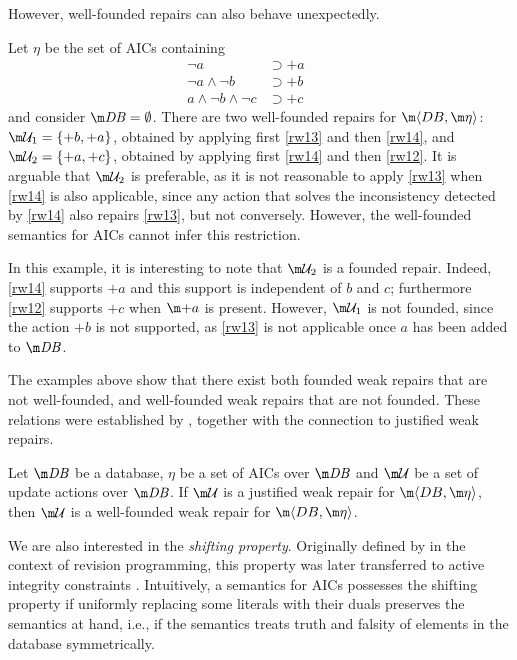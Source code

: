However, well-founded repairs can also behave unexpectedly.
\begin{example}
  \label{ex:well-founded}
  Let $\eta$ be the set of AICs containing
  \begin{align}
  \neg a &\supset{+a} \qquad \label{rw14} \\
  \neg a\land\neg b &\supset{+b} \label{rw13} \\
  a\land\neg b\land\neg c &\supset{+c} \label{rw12}
  \end{align}
  and consider $\db=\emptyset$.
  There are two well-founded repairs for $\fulldb$: $\UU_1=\{{+b},{+a}\}$, obtained by applying first \ref{rw13} and then \ref{rw14}, and $\UU_2=\{{+a},{+c}\}$, obtained by applying first \ref{rw14} and then \ref{rw12}.
  It is arguable that $\UU_2$ is preferable, as it is not reasonable to apply \ref{rw13} when \ref{rw14} is also applicable, since any action that solves the inconsistency detected by \ref{rw14} also repairs \ref{rw13}, but not conversely.
  However, the well-founded semantics for AICs cannot infer this restriction.
\end{example}
In this example, it is interesting to note that $\UU_2$ is a founded repair. Indeed, \ref{rw14} supports ${+a}$ and this support is independent of $b$ and $c$; furthermore  \ref{rw12} supports ${+c}$ when $\add a$ is present. However, $\UU_1$ is not founded, since the action ${+b}$ is not supported, as \ref{rw13} is not applicable once $a$ has been added to $\db$.

The examples above show that there exist both founded weak repairs that are not well-founded, and well-founded weak repairs that are not founded.
These relations were established by \citet{tase/Cruz-FilipeGEN13}, together with the connection to justified weak repairs.
\begin{lemma}
  \label{lem:justified-wf}
  Let $\db$ be a database, $\eta$ be a set of AICs over $\db$ and $\UU$ be a set of update actions over $\db$.
  If $\UU$ is a justified weak repair for $\fulldb$, then $\UU$ is a well-founded weak repair for $\fulldb$.
\end{lemma}

We are also interested in the \emph{shifting property}.
Originally defined by \citet{tcs/MarekT98} in the context of revision programming, this property was later transferred to active integrity constraints \cite{tplp/CaropreseT11}. 
Intuitively, a semantics for AICs possesses the shifting property if uniformly replacing some literals with their duals
preserves the semantics at hand, i.e., if the semantics treats truth and falsity of elements in the database symmetrically.

